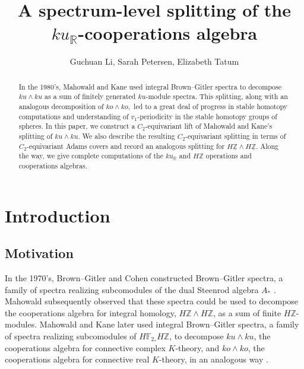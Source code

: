 \documentclass{amsart}
\title{A spectrum-level splitting of the $ku_\mathbb{R}$-cooperations algebra}
\author{Guchuan Li, Sarah Petersen, Elizabeth Tatum }
\theoremstyle{plain}
\numberwithin{equation}{section}
\numberwithin{figure}{section}
\newcommand{\mF}{{\mathbb F}}
\newcommand{\mR}{{\mathbb R}}
\newcommand{\mZ}{{\mathbb Z}}
\newcommand{\umZ}{\underline{\mZ}}
\newcommand{\0}{\langle 0 \rangle }
\begin{document}
\begin{abstract}
    In the 1980's, Mahowald and Kane used integral Brown--Gitler spectra to decompose $ku \wedge ku$ as a sum of finitely generated $ku$-module spectra. This splitting, along with an analogous decomposition of $ko \wedge ko,$ led to a great deal of progress in stable homotopy computations and understanding of $v_1$-periodicity in the stable homotopy groups of spheres. In this paper, we construct a $C_2$-equivariant lift of Mahowald and Kane's splitting of $ku \wedge ku$. We also describe the resulting $C_2$-equivariant splitting in terms of $C_2$-equivariant Adams covers and record an analogous splitting for $H\umZ \wedge H \umZ$. Along the way, we give complete computations of the $ku_{\mR}$ and $H \mZ$ operations and cooperations algebras.
\end{abstract}

\maketitle

\tableofcontents

\section{Introduction}\label{sec:introduction}
\subsection{Motivation} In the 1970's, Brown--Gitler and Cohen constructed Brown--Gitler spectra, a family of spectra realizing subcomodules of the dual Steenrod algebra $A_{*}$ \cite{BrownGitler73,cohen1979geometry}. Mahowald subsequently observed that these spectra could be used to decompose the cooperations algebra for integral homology, $H\mathbb{Z} \wedge H\mathbb{Z}$, as a sum of finite $H\mathbb{Z}$-modules. Mahowald and Kane later used integral Brown--Gitler spectra, a family of spectra realizing subcomodules of $H\mF_{2_{*}}H\mathbb{Z}$, to decompose $ku \wedge ku$, the cooperations algebra for connective complex $K$-theory, and $ko \wedge ko$, the cooperations algebra for connective real $K$-theory, in an analogous way \cite{mahowald1981bo, kane1981operations}. 
\end{document}
